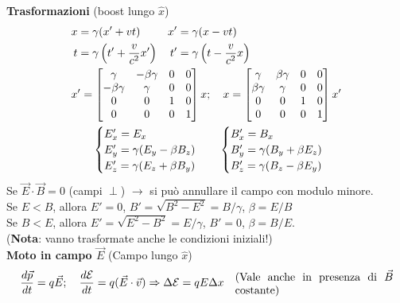 \documentclass{article}
\begin{document}
\begin{minipage}[t]{.5\textwidth}
{\Large \textbf{Trasformazioni}} (boost lungo $\hat{x}$)
\begin{align*}
    x &= \gamma(x'+vt) & x' &= \gamma(x-vt)\\
    t &= \gamma\left (t' + \frac{v}{c^2}x'\right ) &t' &= \gamma\left (t-\frac{v}{c^2}x \right )\\
    \span\span\span
    x' = \begin{bmatrix}
    \gamma & -\beta\gamma & 0 & 0\\
    -\beta\gamma & \gamma & 0 & 0\\
    0 & 0 & 1 & 0\\
    0 & 0 & 0 & 1
    \end{bmatrix}x; \quad x = \begin{bmatrix}
    \gamma & \beta\gamma & 0 & 0\\
    \beta\gamma & \gamma & 0 & 0\\
    0 & 0 & 1 & 0\\
    0 & 0 & 0 & 1
    \end{bmatrix} x'\\
    \span\span\span
    \begin{cases}
    E_x' = E_x\\
    E_y' = \gamma(E_y - \beta B_z)\\
    E_z' = \gamma(E_z + \beta B_y)
    \end{cases} \quad \begin{cases}
    B_x' = B_x\\
    B_y' = \gamma(B_y + \beta E_z)\\
    B_z' = \gamma(B_z - \beta E_y)
    \end{cases}
\end{align*}
Se $\vec{E}\cdot\vec{B} = 0$ (campi $\perp$) $\to$ si può annullare il campo con modulo minore.\\
Se $E < B$, allora $E' = 0$, $B' = \sqrt{B^2-E^2} = B/\gamma$, $\beta = E/B$\\
Se $B < E$, allora $E' = \sqrt{E^2-B^2} = E/\gamma$, $B' = 0$, $\beta = B/E$.\\
(\textbf{Nota}: vanno trasformate anche le condizioni iniziali!)\\
{\Large \textbf{Moto in campo $\vec{E}$}} (Campo lungo $\hat{x}$)
\begin{align*}
    \frac{d\vec{p}}{dt}&=q\vec{E}; \quad \frac{d\mathcal{E}}{dt} = q(\vec{E}\cdot \vec{v}) \Rightarrow \Delta\mathcal{E} = qE\Delta x \quad \parbox{5cm}{(Vale anche in presenza di $\vec{B}$ costante)}\\

\end{align*}
\end{minipage}
\end{document}
